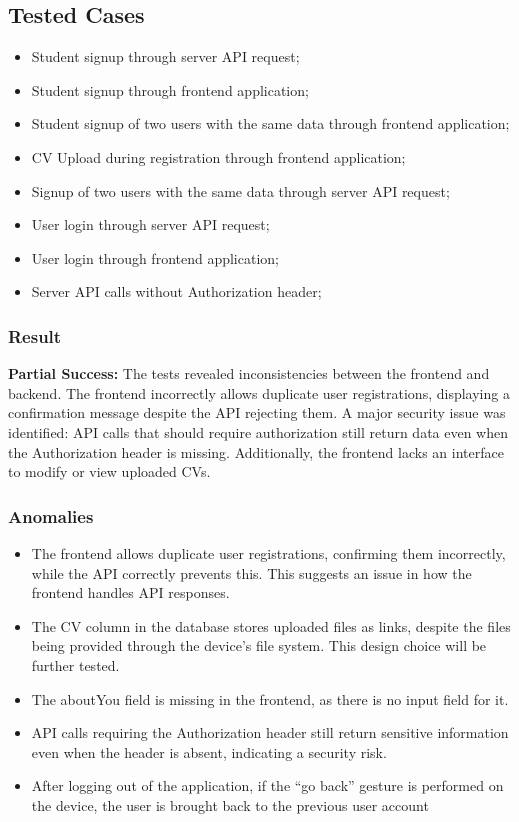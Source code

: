 \subsection*{Tested Cases}
\begin{itemize}
    \item Student signup through server API request;
    \item Student signup through frontend application;
    \item Student signup of two users with the same data through frontend application;
    \item CV Upload during registration through frontend application;
    \item Signup of two users with the same data through server API request;
    \item User login through server API request;
    \item User login through frontend application;
    \item Server API calls without Authorization header;
\end{itemize}

\subsubsection*{Result}
\textbf{Partial Success:}
The tests revealed inconsistencies between the frontend and backend. The frontend incorrectly allows duplicate user registrations, displaying a confirmation message despite the API rejecting them. A major security issue was identified: API calls that should require authorization still return data even when the Authorization header is missing. Additionally, the frontend lacks an interface to modify or view uploaded CVs.

\subsubsection*{Anomalies}
\begin{itemize}
    \item The frontend allows duplicate user registrations, confirming them incorrectly, while the API correctly prevents this. This suggests an issue in how the frontend handles API responses.
    \item The CV column in the database stores uploaded files as links, despite the files being provided through the device's file system. This design choice will be further tested.
    \item The aboutYou field is missing in the frontend, as there is no input field for it.
    \item API calls requiring the Authorization header still return sensitive information even when the header is absent, indicating a security risk.
    \item After logging out of the application, if the “go back” gesture is performed on the device, the user is brought back to the previous user account
    
\end{itemize}

